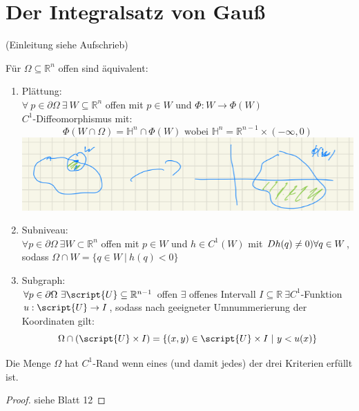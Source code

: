 \chapter{Der Integralsatz von Gauß}

(Einleitung siehe Aufschrieb)

\begin{theorem}
  Für $\Omega \subseteq \mathbb{R}^n$ offen sind äquivalent:
  \begin{enumerate}
    \item Plättung:\\
      $\forall \ p \in \partial \Omega \ \exists \ W \subseteq \mathbb{R}^n$ offen mit $p \in W$ und $\Phi: W\to \Phi(W)$\\
      $C^1$-Diffeomorphismus mit:
      $$\Phi(W \cap \Omega) = \mathbb{H}^n \cap \Phi(W) \text{ wobei } \mathbb{H}^n = \mathbb{R}^{n-1} \times (-\infty, 0)$$
      \includegraphics[width=.8\textwidth]{img/IX_1_Plaettung.png}
    \item Subniveau:\\
      $\forall p\in \partial \Omega \ \exists W \subset \mathbb{R}^n$ offen mit $p \in W$ und $h \in C^1(W)$ mit $Dh(q) \neq 0) \\\forall q \in W$, sodass $\Omega \cap W = \{q \in W \ | \ h(q) < 0\}$
    \item Subgraph:\\
      $\forall p \in \partial\Omega \ \exists \script{U} \subseteq \mathbb{R}^{n-1}$ offen $\exists$ offenes Intervall $I \subseteq \mathbb{R} \ \exists C^1$-Funktion $u: \script{U} \to I$, sodass nach geeigneter Umnummerierung der Koordinaten gilt:
      $$\Omega \cap (\script{U} \times I) = \{(x,y) \in \script{U} \times I \ | \ y < u(x)\}$$
  \end{enumerate}
  Die Menge $\Omega$ hat $C^1$-Rand wenn eines (und damit jedes) der drei Kriterien erfüllt ist.
\end{theorem}
\begin{proof}
  siehe Blatt 12
\end{proof}

